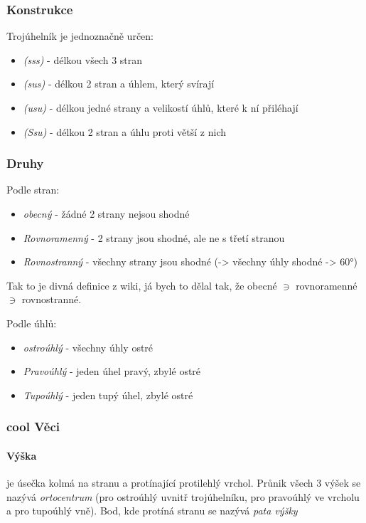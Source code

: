 \documentclass[12pt]{article}
\begin{document}
\subsubsection{Konstrukce}
\label{sec:troj-shodnost}
Trojúhelník je jednoznačně určen:
\begin{itemize}
\item \emph{(sss)} - délkou všech 3 stran
\item \emph{(sus)} - délkou 2 stran a úhlem, který svírají
\item \emph{(usu)} - délkou jedné strany a velikostí úhlů, které k ní přiléhají
\item \emph{(Ssu)} - délkou 2 stran a úhlu proti větší z nich
\end{itemize}
\subsubsection{Druhy}
Podle stran:
\begin{itemize}
\item \emph{obecný} - žádné 2 strany nejsou shodné
\item \emph{Rovnoramenný} - 2 strany jsou shodné, ale ne s třetí stranou
\item \emph{Rovnostranný} - všechny strany jsou shodné (->  všechny úhly shodné -> 60°) 
\end{itemize}
\begin{scriptsize}
Tak to je divná definice z wiki, já bych to dělal tak, že obecné $\ni$ rovnoramenné $\ni$ rovnostranné.\\
\end{scriptsize}
Podle úhlů:
\begin{itemize}
\item \emph{ostroúhlý} - všechny úhly ostré
\item \emph{Pravoúhlý} - jeden úhel pravý, zbylé ostré
\item \emph{Tupoúhlý} - jeden tupý úhel, zbylé ostré
\end{itemize}
\subsubsection{cool Věci}
\paragraph{Výška} je úsečka kolmá na stranu a protínající protilehlý vrchol. Průnik všech 3 výšek se nazývá \emph{ortocentrum} (pro ostroúhlý uvnitř trojúhelníku, pro pravoúhlý ve vrcholu a pro tupoúhlý vně). Bod, kde protíná stranu se nazývá \emph{pata výšky}
\end{document}
